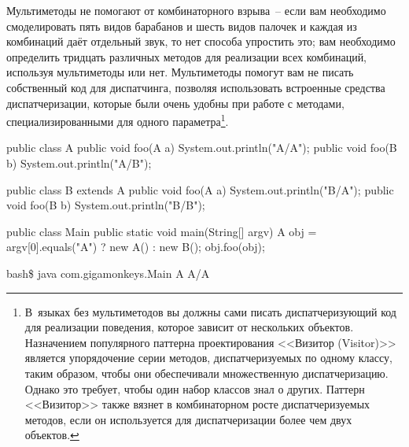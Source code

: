 Мультиметоды не помогают от комбинаторного взрыва~-- если вам необходимо смоделировать
пять видов барабанов и шесть видов палочек и каждая из комбинаций даёт отдельный звук, то
нет способа упростить это; вам необходимо определить тридцать различных методов для
реализации всех комбинаций, используя мультиметоды или нет.  Мультиметоды помогут вам не
писать собственный код для диспатчинга, позволяя использовать встроенные средства
диспатчеризации, которые были очень удобны при работе с методами, специализированными для
одного параметра\footnote{В~языках без мультиметодов вы должны сами писать
  диспатчеризующий код для реализации поведения, которое зависит от нескольких объектов.
  Назначением популярного паттерна проектирования <<Визитор (Visitor)>> является
  упорядочение серии методов, диспатчеризуемых по одному классу, таким образом, чтобы они
  обеспечивали множественную диспатчеризацию.  Однако это требует, чтобы один набор
  классов знал о других.  Паттерн <<Визитор>> также вязнет в комбинаторном росте
  дис\-пат\-че\-ри\-зуе\-мых методов, если он используется для диспатчеризации более чем двух
  объектов.}.

\begin{lrbox}{\chonesixone}
  \begin{minipage}{\linewidth}
\begin{myverb}
public class A {
  public void foo(A a) { System.out.println("A/A"); }
  public void foo(B b) { System.out.println("A/B"); }
}

public class B extends A {
  public void foo(A a) { System.out.println("B/A"); }
  public void foo(B b) { System.out.println("B/B"); }
}
\end{myverb}
  \end{minipage}
\end{lrbox}

\begin{lrbox}{\chonesixtwo}
  \begin{minipage}{\linewidth}
\begin{myverb}
public class Main {
  public static void main(String[] argv) {
    A obj = argv[0].equals("A") ? new A() : new B();
    obj.foo(obj);
  }
}
\end{myverb}
  \end{minipage}
\end{lrbox}

\begin{lrbox}{\chonesixthree}
  \begin{minipage}{\linewidth}
\begin{myverb}
bash\$ java com.gigamonkeys.Main A
A/A
\end{myverb}
  \end{minipage}
\end{lrbox}

